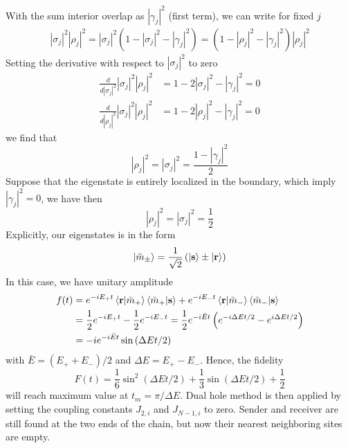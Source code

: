 \documentclass[../../../main.tex]{subfiles}
\begin{document}
With the sum interior overlap as $|\gamma_j|^2$ (first term), we can write for fixed $j$
\begin{align*}
    |\sigma_j|^2|\rho_j|^2 = |\sigma_j|^2 \left( 1 - |\sigma_j|^2 -  |\gamma_j|^2\right)
    = \left( 1 - |\rho_j|^2 -  |\gamma_j|^2\right) |\rho_j|^2
\end{align*}
Setting the derivative with respect to $|\sigma_j|^2$ to zero
\begin{align*}
    \frac{d }{d|\sigma_j|^2} |\sigma_j|^2|\rho_j|^2 & =  1 - 2|\sigma_j|^2 -|\gamma_j|^2 = 0 \\
    \frac{d }{d|\rho_j|^2} |\sigma_j|^2|\rho_j|^2   & =  1 - 2|\rho_j|^2 -|\gamma_j|^2 = 0
\end{align*}
we find that
\begin{equation*}
    |\rho_j|^2 = |\sigma_j|^2 = \frac{1 - |\gamma_j |^2}{2}
\end{equation*}
Suppose that the eigenstate is entirely localized in the boundary, which imply $|\gamma_j|^2=0$, we have then
\begin{equation*}
    |\rho_j|^2 = |\sigma_j|^2 = \frac{1 }{2 }
\end{equation*}
Explicitly, our eigenstates is in the form
\begin{equation*}
    \ket{\tilde{m}_\pm} = \frac{1 }{\sqrt{2}} \left( \ket{\mathbf{s }} \pm \ket{\mathbf{r}} \right)
\end{equation*}
In this case, we have unitary amplitude
\begin{align*}
    f(t) & =
    e ^{-i E_+ t} \braket{\mathbf{r } |\tilde{m}_+ } \braket{\tilde{m}_+  | \mathbf{s}} +
    e ^{-i E_- t} \braket{\mathbf{r } |\tilde{m}_- } \braket{\tilde{m}_-  | \mathbf{s}}                                                              \\
         & = \frac{1 }{2 }e ^{-i E_+ t} - \frac{1 }{2} e ^{-i E_- t} = \frac{1}{2} e^{-i \bar{E} t}\left(e^{-i\Delta E t/2}-e^{i\Delta E t/2}\right) \\
         & = - i e ^{-i \bar{E} t}\sin \left( \Delta E t /2 \right)
\end{align*}
with $\bar{E} = (E_++E_-)/2$ and $\Delta E = E_+ - E_-$.
Hence, the fidelity
\begin{equation*}
    F(t) = \frac{1 }{6 } \sin^2 \left( \Delta E t /2 \right) + \frac{1 }{3 }\sin \left( \Delta E t /2 \right) + \frac{1 }{2 }
\end{equation*}
will reach maximum value at $t_m = \pi/\Delta E$.
Dual hole method is then applied by setting the coupling constants $J_{2,i}$ and $J_{N-1,i}$ to zero.
Sender and receiver are still found at the two ends of the chain, but now their nearest neighboring sites are empty.
\end{document}
